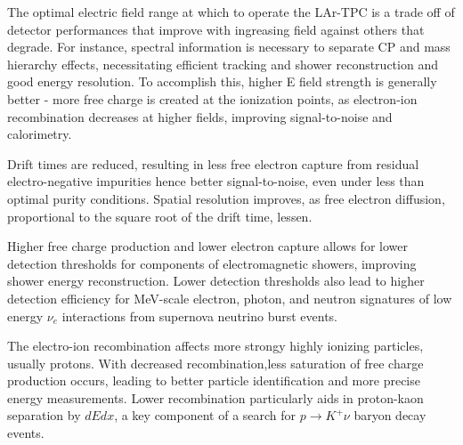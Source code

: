The optimal electric field range at which to operate the LAr-TPC is a trade off  of detector performances that improve with ingreasing field against others that degrade. For instance, spectral information is necessary to separate CP and mass hierarchy effects, necessitating efficient tracking and shower reconstruction and good energy resolution. To accomplish this, higher E field strength is generally better - more free charge is created at the ionization points, as electron-ion recombination decreases at higher fields, improving signal-to-noise and calorimetry. 


Drift times are reduced, resulting in less free electron capture from residual electro-negative impurities hence better signal-to-noise, even under less than optimal purity conditions.  Spatial resolution improves, as free electron diffusion, proportional to the square root of the drift time, lessen. 

Higher free charge production and lower electron capture allows for lower detection thresholds for components of electromagnetic showers, improving shower energy reconstruction. Lower detection thresholds also lead to higher detection efficiency for MeV-scale electron, photon, and neutron signatures of low energy $\nu_e$ interactions from supernova neutrino burst events.  

The electro-ion recombination affects more strongy highly ionizing particles, usually protons.  With decreased recombination,less saturation of free charge production occurs,  leading to better particle identification and more precise energy measurements.  Lower recombination particularly aids in proton-kaon separation by $dEdx$, a key component of a search for $p\rightarrow K^+ \nu$ baryon decay events. 

